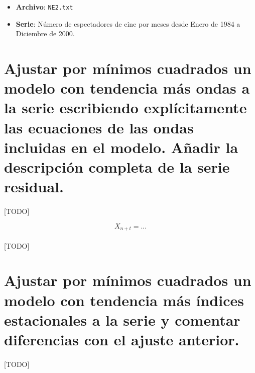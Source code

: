 \documentclass[a4paper, spanish]{article}
\begin{document}
  \maketitle

  \begin{itemize}
    \item \textbf{Archivo}: \texttt{NE2.txt}
    \item \textbf{Serie}: Número de espectadores de cine por meses desde Enero de 1984 a Diciembre de 2000.
  \end{itemize}

  \section{Ajustar por mínimos cuadrados un modelo con tendencia más ondas a la serie escribiendo explícitamente las ecuaciones de las ondas incluidas en el modelo. Añadir la descripción completa de la serie residual.}

    \paragraph{}
    [TODO]


    \begin{equation}
    \label{eq:waves_model}
      X_{n + t} = ...
    \end{equation}

    \paragraph{}
    [TODO]


  \section{Ajustar por mínimos cuadrados un modelo con tendencia más índices estacionales a la serie y comentar diferencias con el ajuste anterior.}

    \paragraph{}
    [TODO]
\end{document}
